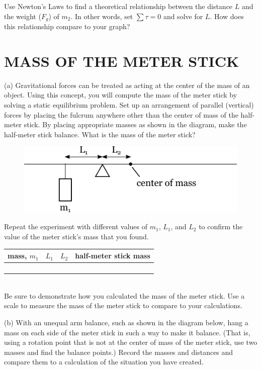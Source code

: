 \documentclass[11pt,letterpaper]{article}
\begin{document}
Use Newton's Laws to find a theoretical relationship between the distance $L$ and the weight ($F_g$) of $m_2$. In other words, set $\sum\tau=0$ and solve for $L$. How does this relationship compare to your graph?


\section{MASS OF THE METER STICK}
(a) Gravitational forces can be treated as acting at the center of the mass of an object. Using this concept, you will compute the mass of the meter stick by solving a static equilibrium problem. Set up an arrangement of parallel (vertical) forces by placing the fulcrum anywhere other than the center of mass of the half-meter stick. By placing appropriate masses as shown in the diagram, make the half-meter stick balance.  What is the mass of the meter stick?

\begin{figure}[h]
\begin{center}
\includegraphics{./lab6_part2a.pdf}
\end{center}
\end{figure}

Repeat the experiment with different values of $m_1$, $L_1$, and $L_2$ to confirm the value of the meter stick's mass that you found.
 
\begin{tabularx}{\linewidth}{|Y|Y|Y|Y|}
\hline
mass, $m_1$ & $L_1$ & $L_2$ & half-meter stick mass \\
\hline &&&\\
\hline &&&\\
\hline &&&\\
\hline &&&\\
\hline
\end{tabularx}\\

Be sure to demonstrate how you calculated the mass of the meter stick. Use a scale to measure the mass of the meter stick to compare to your calculations.

\clearpage
(b) With an unequal arm balance, such as shown in the diagram below, hang
a mass on each side of the meter stick in such a way to make it
balance.  (That is, using a rotation point that is not at the center
of mass of the meter stick, use two masses and find the balance
points.)  Record the masses and distances and compare them to a
calculation of the situation you have created.
\end{document}
